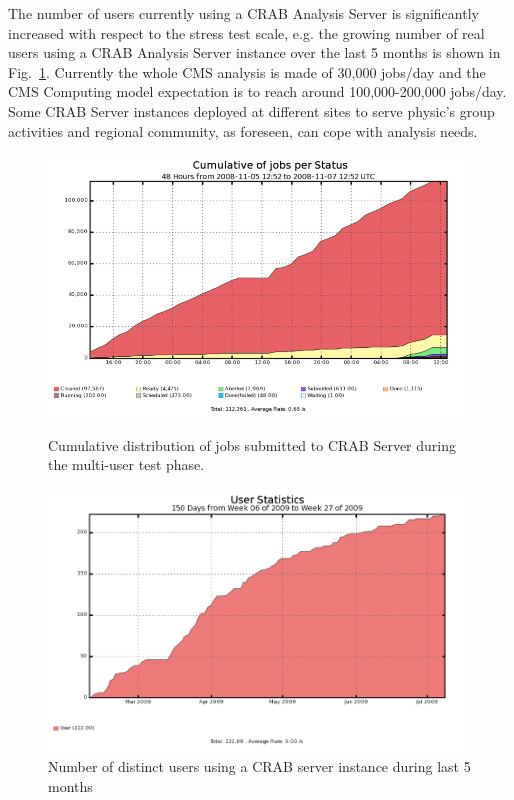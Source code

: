 The number of users currently using a CRAB Analysis Server is significantly 
increased with respect to the stress test scale, e.g. the growing number of real users using a CRAB Analysis Server instance over the last 5 months is shown in Fig.~\ref{fig:CSusers}.
Currently the whole CMS analysis is made of 30,000 jobs/day and the
CMS Computing model expectation is to reach around 100,000-200,000 jobs/day. 
Some CRAB Server instances deployed at different sites to serve physic's
group activities and regional community, as foreseen, can cope with
analysis needs.
\begin{figure}
\begin{minipage}{.48\textwidth}
\centering
\includegraphics[width=0.99\textwidth]{figures/MultiUserJobStatus.png}
\caption{Cumulative distribution of jobs submitted to CRAB Server
  during the multi-user test phase. }
\label{fig:stressmulti}
\end{minipage}
\begin{minipage}{.48\textwidth}
\centering
\includegraphics[width=0.99\textwidth]{figures/CSusersLast5months.png}
\caption{Number of distinct users using a CRAB server instance during last 5 months}
\label{fig:CSusers}
\end{minipage}
\end{figure}



